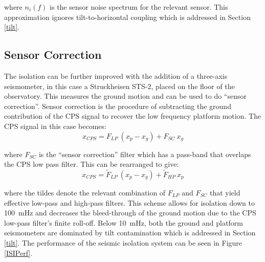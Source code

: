 \documentclass [12pt, proquest]{uwthesis}[2019]
\begin{document}
where $n_{i}(f)$ is the sensor noise spectrum for the relevant sensor. This approximation ignores tilt-to-horizontal coupling which is addressed in Section \ref{tilt}.

\subsection{Sensor Correction}\label{SensCor}

The isolation can be further improved with the addition of a three-axis seismometer, in this case a Struckheisen STS-2, placed on the floor of the observatory. This measures the ground motion and can be used to do ``sensor correction''. Sensor correction is the procedure of subtracting the ground contribution of the CPS signal to recover the low frequency platform motion. The CPS signal in this case becomes:
\begin{equation}
x_{CPS}=F_{LP}\ (x_p-x_g)+F_{SC}\ x_g
\end{equation}

where $F_{SC}$ is the ``sensor correction'' filter which has a pass-band that overlaps the CPS low pass filter. This can be rearranged to give:
\begin{equation}
x_{CPS}=\tilde F_{LP}\ (x_p-x_g)+\tilde F_{HP}\ x_p
\end{equation}

where the tildes denote the relevant combination of $F_{LP}$ and $F_{SC}$ that yield effective low-pass and high-pass filters. This scheme allows for isolation down to 100~mHz and decreases the bleed-through of the  ground motion due to the CPS low-pass filter's finite roll-off. Below 10~mHz, both the ground and platform seismometers are dominated by tilt contamination which is addressed in Section \ref{tilt}. The performance of the seismic isolation system can be seen in Figure \ref{ISIPerf}.
\end{document}
